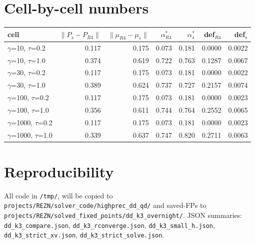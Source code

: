 \documentclass[11pt]{article}
\begin{document}
\section{Cell-by-cell numbers}

\begin{center}
\small
\begin{tabular}{lrrrrrr}
\toprule
cell & $\|P_s\!-\!P_{R4}\|$ & $\|\mu_{R4}\!-\!\mu_s\|$ &
$\alpha^*_{R4}$ & $\alpha^*_s$ & def$_{R4}$ & def$_s$ \\
\midrule
$\gamma$=10, $\tau$=0.2  & 0.117 & 0.175 & 0.073 & 0.181 & 0.0000 & 0.0022 \\
$\gamma$=10, $\tau$=1.0  & 0.374 & 0.619 & 0.722 & 0.763 & 0.1287 & 0.0067 \\
$\gamma$=30, $\tau$=0.2  & 0.117 & 0.175 & 0.073 & 0.181 & 0.0000 & 0.0022 \\
$\gamma$=30, $\tau$=1.0  & 0.389 & 0.624 & 0.737 & 0.727 & 0.2157 & 0.0074 \\
$\gamma$=100, $\tau$=0.2 & 0.117 & 0.175 & 0.073 & 0.181 & 0.0000 & 0.0023 \\
$\gamma$=100, $\tau$=1.0 & 0.356 & 0.611 & 0.744 & 0.764 & 0.2552 & 0.0065 \\
$\gamma$=1000, $\tau$=0.2 & 0.117 & 0.175 & 0.073 & 0.181 & 0.0000 & 0.0023 \\
$\gamma$=1000, $\tau$=1.0 & 0.339 & 0.637 & 0.747 & 0.820 & 0.2711 & 0.0063 \\
\bottomrule
\end{tabular}
\end{center}

\section{Reproducibility}

All code in \texttt{/tmp/}, will be copied to
\texttt{projects/REZN/solver\_code/highprec\_dd\_qd/} and saved-FPs
to \texttt{projects/REZN/solved\_fixed\_points/dd\_k3\_overnight/}.
JSON summaries:
\texttt{dd\_k3\_compare.json},
\texttt{dd\_k3\_rconverge.json},
\texttt{dd\_k3\_small\_h.json},
\texttt{dd\_k3\_strict\_xv.json},
\texttt{dd\_k3\_strict\_solve.json}.
\end{document}
